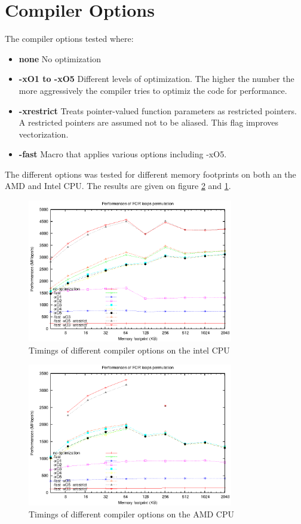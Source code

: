 \section{Compiler Options}
The compiler options tested where:
\begin{itemize}
\item \textbf{none} No optimization
\item \textbf{-xO1 to -xO5} Different levels of optimization. The higher the number the more aggressively the compiler tries to optimiz the code for performance.
\item \textbf{-xrestrict} Treats pointer-valued function parameters as restricted pointers. A restricted pointers are assumed not to be aliased. This flag improves vectorization.
\item \textbf{-fast} Macro that applies various options including -xO5. 
\end{itemize}
The different options was tested for different memory footprints on both an the AMD and Intel CPU. The results are given on figure \ref{fig:compilerOptionsAmd} and \ref{fig:compilerOptionsIntel}.
\begin{figure}[here]
\centering
\includegraphics[width=0.8\textwidth]{results/flag-test-plot-intel.eps}
\caption{Timings of different compiler options on the intel CPU}
\label{fig:compilerOptionsIntel}
\end{figure}
\begin{figure}[here]
\centering
\includegraphics[width=0.8\textwidth]{results/flag-test-plot-amd.eps}
\caption{Timings of different compiler options on the AMD CPU}
\label{fig:compilerOptionsAmd}
\end{figure}
